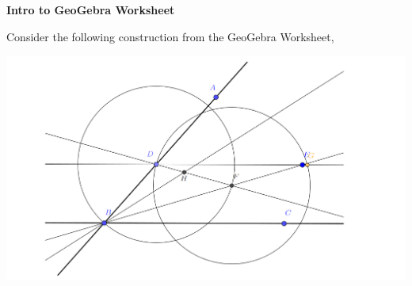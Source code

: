 \documentclass[12pt]{article}
\theoremstyle{homework}
\begin{document}
\begin{enumerate}
\vspace{.5in}



\end{enumerate}
\vspace{.5in}

\textbf{Intro to GeoGebra Worksheet}

Consider the following construction from the GeoGebra Worksheet,
\begin{center}
  \includegraphics[width = \textwidth]{trisectangle.png}
\end{center}
\end{document}
